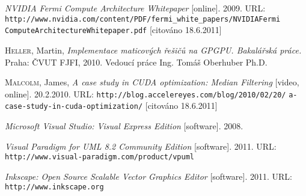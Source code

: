 \begin{thebibliography}{99}
        \textit{NVIDIA Fermi Compute Architecture Whitepaper} [online]. 2009.
        URL: {\tt http://www.nvidia.com/content/PDF/fermi\_white\_papers/NVIDIAFermi} {\tt ComputeArchitectureWhitepaper.pdf} [citováno 18.6.2011]

        \textsc{Heller}, Martin, \textit{Implementace maticových řešičů na GPGPU.
        Bakalářská práce.} Praha: ČVUT FJFI, 2010. Vedoucí práce Ing. Tomáš Oberhuber Ph.D.

        \textsc{Malcolm}, James, \textit{A case study in CUDA optimization: Median Filtering} [video, online]. 20.2.2010.
        URL: {\tt http://blog.accelereyes.com/blog/2010/02/20/} {\tt a-case-study-in-cuda-optimization/} [citováno 18.6.2011]

        \textit{Microsoft Visual Studio: Visual  Express Edition} [software]. 2008.
        
        \textit{Visual Paradigm for UML 8.2 Community Edition} [software]. 2011.
         URL: {\tt http://www.visual-paradigm.com/product/vpuml}
        
        \textit{Inkscape: Open Source Scalable Vector Graphics Editor} [software]. 2011.
         URL: {\tt http://www.inkscape.org}

\end{thebibliography} 